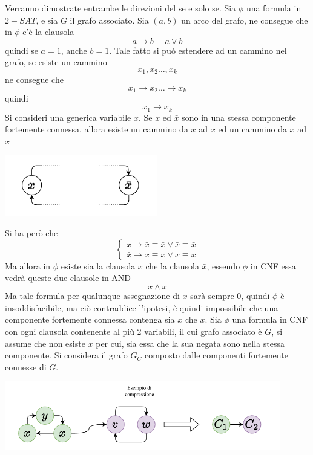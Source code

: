 \documentclass[10pt, letterpaper]{report}
\begin{document}
\dimo{} Verranno dimostrate entrambe le direzioni del se e solo se. \acc 
\boxedMath{$\implies$} Sia $\phi$ una formula in $2-SAT$, e sia $G$ il grafo associato. Sia $(a,b)$ un arco del grafo, ne consegue che in $\phi$ c'è la clausola 
$$ a\rightarrow b \equiv \bar a \lor b$$
quindi se $a=1$, anche $b=1$. Tale fatto si può estendere ad un cammino nel grafo, se esiste un cammino 
$$ x_1,x_2\dots , x_k$$
ne consegue che 
$$ x_1\rightarrow x_2 \dots \rightarrow x_k$$
quindi 
$$ x_1 \rightarrow x_k$$
Si consideri una generica variabile $x$. Se $x$ ed $\bar x$ sono in una stessa componente fortemente connessa, allora esiste un cammino da $x$ ad $\bar x$ ed un cammino da $\bar x$ ad $x$\begin{center}
    \includegraphics[width=0.5\textwidth ]{images/dimoGrafo.pdf}
\end{center}
Si ha però che 
$$ \begin{cases}
    x\rightarrow \bar x \equiv \bar x \lor \bar x\equiv \bar x   \\ 
    \bar x \rightarrow x \equiv x \lor x\equiv x 
\end{cases}$$
Ma allora in $\phi$ esiste sia la clausola $x$ che la clausola $\bar x$, essendo $\phi$ in CNF essa vedrà queste due clausole in AND 
$$ x \land \bar x $$
Ma tale formula per qualunque assegnazione di $x$ sarà sempre 0, quindi $\phi$ è insoddisfacibile, ma ciò contraddice l'ipotesi, è quindi impossibile che una componente fortemente connessa contenga sia $x$ che $\bar x$. \acc  
\boxedMath{$\impliedby$} Sia $\phi$ una formula in CNF con ogni clausola contenente al più 2 variabili, il cui grafo associato è $G$, si assume che non esiste $x$ per cui, sia essa che la sua negata sono nella stessa componente. Si considera il grafo $G_C$ composto dalle componenti fortemente connesse di $G$.
\begin{center}
    \includegraphics[width=0.9\textwidth ]{images/compressione.pdf}
\end{center}
\end{document}
